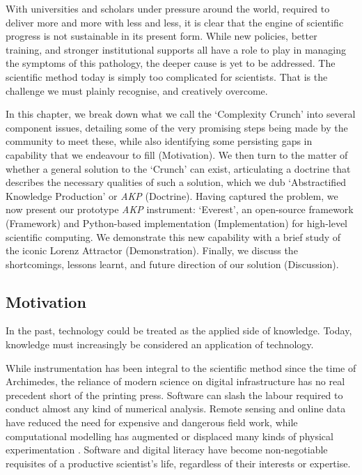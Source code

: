 \documentclass[a4paper,11pt,oneside]{book}
\begin{document}
With universities and scholars under pressure around the world, required to deliver more and more with less and less, it is clear that the engine of scientific progress is not sustainable in its present form. While new policies, better training, and stronger institutional supports all have a role to play in managing the symptoms of this pathology, the deeper cause is yet to be addressed. The scientific method today is simply too complicated for scientists. That is the challenge we must plainly recognise, and creatively overcome.

In this chapter, we break down what we call the `Complexity Crunch' into several component issues, detailing some of the very promising steps being made by the community to meet these, while also identifying some persisting gaps in capability that we endeavour to fill (Motivation). We then turn to the matter of whether a general solution to the `Crunch' can exist, articulating a doctrine that describes the necessary qualities of such a solution, which we dub `Abstractified Knowledge Production' or \textit{AKP} (Doctrine). Having captured the problem, we now present our prototype \textit{AKP} instrument: `Everest', an open-source framework (Framework) and Python-based implementation (Implementation) for high-level scientific computing. We demonstrate this new capability with a brief study of the iconic Lorenz Attractor (Demonstration). Finally, we discuss the shortcomings, lessons learnt, and future direction of our solution (Discussion).

\subsection{Motivation}

In the past, technology could be treated as the applied side of knowledge. Today, knowledge must increasingly be considered an application of technology.

While instrumentation has been integral to the scientific method since the time of Archimedes, the reliance of modern science on digital infrastructure has no real precedent short of the printing press. Software can slash the labour required to conduct almost any kind of numerical analysis. Remote sensing and online data have reduced the need for expensive and dangerous field work, while computational modelling has augmented or displaced many kinds of physical experimentation \cite{Heaton2015-wg}. Software and digital literacy have become non-negotiable requisites of a productive scientist's life, regardless of their interests or expertise.
\end{document}
